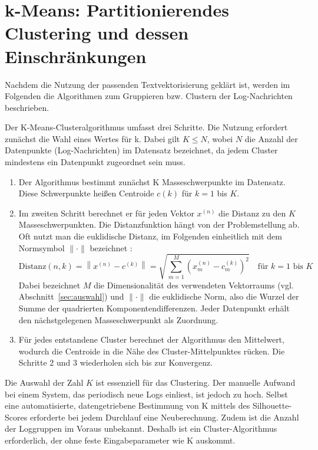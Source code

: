\section{k-Means: Partitionierendes Clustering und dessen Einschränkungen}
\label{sec:kmeans}
Nachdem die Nutzung der passenden Textvektorisierung geklärt ist, werden im Folgenden die Algorithmen zum Gruppieren bzw. Clustern der Log-Nachrichten beschrieben.

Der K-Means-Clusteralgorithmus umfasst drei Schritte. Die Nutzung erfordert zunächst die Wahl eines Wertes für k. Dabei gilt $K \leq N$, wobei $N$ die Anzahl der Datenpunkte (Log-Nachrichten) im Datensatz bezeichnet, da jedem Cluster mindestens ein Datenpunkt zugeordnet sein muss.

\begin{enumerate}
    \item Der Algorithmus bestimmt zunächst K Masseschwerpunkte im Datensatz. Diese Schwerpunkte heißen Centroide $c(k)$ für $k = 1$ bis $K$.
    \item Im zweiten Schritt berechnet er für jeden Vektor $x^{(n)}$ die Distanz zu den $K$ Masseschwerpunkten. Die Distanzfunktion hängt von der Problemstellung ab. Oft nutzt man die euklidische Distanz, im Folgenden einheitlich mit dem Normsymbol $\|\cdot\|$ bezeichnet \cite{Wilmott2020-rx}:
    \begin{equation}
      \text{Distanz}(n,k) = \left\| x^{(n)} - c^{(k)} \right\| = \sqrt{ \sum_{m=1}^{M} \left( x_m^{(n)} - c_m^{(k)} \right)^2 } \quad \text{für } k=1 \text{ bis } K
      \label{eq:distanz}
    \end{equation}
    Dabei bezeichnet $M$ die Dimensionalität des verwendeten Vektorraums (vgl. Abschnitt~\ref{sec:auswahl}) und $\|\cdot\|$ die euklidische Norm, also die Wurzel der Summe der quadrierten Komponentendifferenzen. Jeder Datenpunkt erhält den nächstgelegenen Masseschwerpunkt als Zuordnung.
    \item Für jedes entstandene Cluster berechnet der Algorithmus den Mittelwert, wodurch die Centroide in die Nähe des Cluster-Mittelpunktes rücken. Die Schritte 2 und 3 wiederholen sich bis zur Konvergenz.
\end{enumerate}
Die Auswahl der Zahl $K$ ist essenziell für das Clustering.
Der manuelle Aufwand bei einem System, das periodisch neue Logs einliest, ist jedoch zu hoch. Selbst eine automatisierte, datengetriebene Bestimmung von K mittels des Silhouette-Scores erforderte bei jedem Durchlauf eine Neuberechnung. Zudem ist die Anzahl der Loggruppen im Voraus unbekannt. Deshalb ist ein Cluster-Algorithmus erforderlich, der ohne feste Eingabeparameter wie K auskommt.

